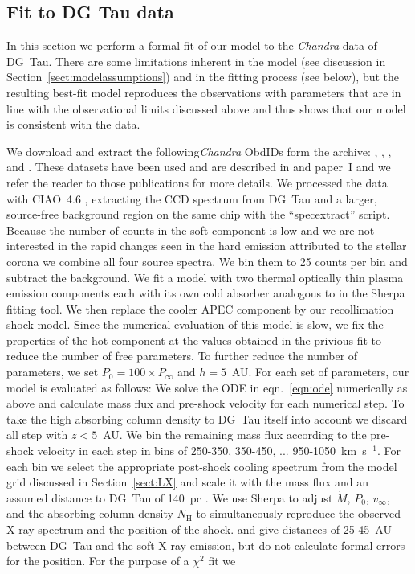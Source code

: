 \subsection{Fit to DG Tau data}
In this section we perform a formal fit of our model to the \emph{Chandra} data of DG~Tau. There are some limitations inherent in the model (see discussion in Section~\ref{sect:modelassumptions}) and in the fitting process (see below), but the resulting best-fit model reproduces the observations with parameters that are in line with the observational limits discussed above and thus shows that our model is consistent with the data.

We download and extract the following\emph{Chandra} ObdIDs form the archive: , , , and . These datasets have been used and are described in \citet{2008A&A...478..797G,2008A&A...488L..13S} and paper~I and we refer the reader to those publications for more details. We processed the data with CIAO~4.6 \citep{http://adsabs.harvard.edu/abs/2006SPIE.6270E..60F}, extracting the CCD spectrum from DG~Tau and a larger, source-free background region on the same chip with the ``specextract'' script. Because the number of counts in the soft component is low and we are not interested in the rapid changes seen in the hard emission attributed to the stellar corona \citep{2008A&A...478..797G} we combine all four source spectra. We bin them to 25 counts per bin and subtract the background. We fit a model with two thermal optically thin plasma emission components \citep[APEC][]{http://adsabs.harvard.edu/abs/2012ApJ...756..128F} each with its own cold absorber analogous to \citep{2008A&A...478..797G} in the Sherpa fitting tool. We then replace the cooler APEC component by our recollimation shock model. Since the numerical evaluation of this model is slow, we fix the properties of the hot component at the values obtained in the privious fit to reduce the number of free parameters. To further reduce the number of parameters, we set $P_0 = 100\times P_\infty$ and $h=5$~AU. For each set of parameters, our model is evaluated as follows: We solve the ODE in eqn.~\ref{eqn:ode} numerically as above and calculate mass flux and pre-shock velocity for each numerical step. To take the high absorbing column density to DG~Tau itself into account we discard all step with $z<5$~AU. We bin the remaining mass flux according to the pre-shock velocity in each step in bins of 250-350, 350-450, ... 950-1050~km~s$^{-1}$. For each bin we select the appropriate post-shock cooling spectrum from the model grid discussed in Section~\ref{sect:LX} and scale it with the mass flux and an assumed distance to DG~Tau of 140~pc \citep{http://adsabs.harvard.edu/abs/1994AJ....108.1872K}. We use Sherpa to adjust $\dot M$, $P_0$, $v_\infty$, and the absorbing column density $N_\textrm{H}$ to simultaneously reproduce the observed X-ray spectrum and the position of the shock. \citet{2008A&A...488L..13S} and \citet{2011ASPC..448..617G} give distances of 25-45~AU between DG~Tau and the soft X-ray emission, but do not calculate formal errors for the position. For the purpose of a $\chi^2$ fit we 